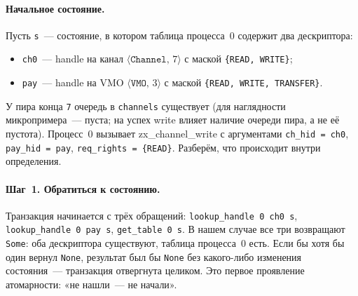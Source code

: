 \documentclass[11pt,a4paper]{article}
\newcommand{\isabel}[1]{{\isabelleit #1}}
\newcommand{\lemmaname}[1]{\isabel{#1}}
\begin{document}
\paragraph{Начальное состояние.}
Пусть \texttt{s}~--- состояние, в котором таблица процесса~0 содержит
два дескриптора:
\begin{itemize}[leftmargin=1.4em]
	\item \texttt{ch0}~--- handle на канал $\langle\texttt{Channel},\,7\rangle$
	      с маской \texttt{\{READ, WRITE\}};
	\item \texttt{pay}~--- handle на VMO $\langle\texttt{VMO},\,3\rangle$
	      с маской \texttt{\{READ, WRITE, TRANSFER\}}.
\end{itemize}
У пира конца \texttt{7} очередь в \texttt{channels} существует
(для наглядности микропримера~--- пуста; на успех write влияет
наличие очереди пира, а не её пустота). Процесс~0 вызывает
\lemmaname{zx\_channel\_write} с аргументами
\texttt{ch\_hid = ch0}, \texttt{pay\_hid = pay},
\texttt{req\_rights = \{READ\}}. Разберём, что происходит внутри
определения.

\paragraph{Шаг~1. Обратиться к состоянию.}
Транзакция начинается с трёх обращений:
\texttt{lookup\_handle 0 ch0 s}, \texttt{lookup\_handle 0 pay s},
\texttt{get\_table 0 s}. В нашем случае все три возвращают
\texttt{Some}: оба дескриптора существуют, таблица процесса~0 есть.
Если бы хотя бы один вернул \texttt{None}, результат был бы \texttt{None}
без какого-либо изменения состояния~--- транзакция отвергнута целиком.
Это первое проявление атомарности: «не нашли~--- не начали».
\end{document}
